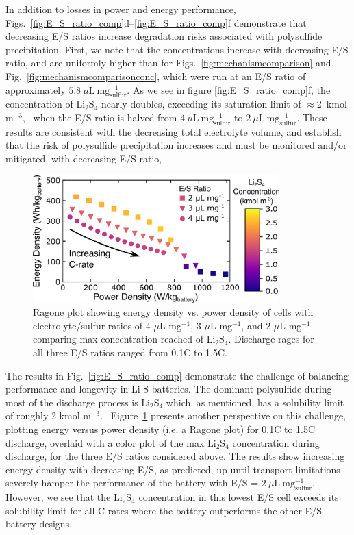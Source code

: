 \documentclass{elsarticle}
\begin{document}
In addition to losses in power and energy performance, Figs.~\ref{fig:E_S_ratio_comp}d--\ref{fig:E_S_ratio_comp}f demonstrate that decreasing E/S ratios increase degradation risks associated with polysulfide precipitation. First, we note that the concentrations increase with decreasing E/S ratio, and are uniformly higher than for Figs.~\ref{fig:mechanismcomparison} and Fig.~\ref{fig:mechanismcomparisonconc}, which were run at an E/S ratio of approximately $5.8 ~ \mu \mathrm{L} ~ \mathrm{mg}^{-1}_\mathrm{sulfur}$. As we see in figure \ref{fig:E_S_ratio_comp}f, the concentration of $\mathrm{Li}_2\mathrm{S}_4$ nearly doubles, exceeding its saturation limit of $\approx$2~kmol m$^{-3}$,~\cite{ANDREI2018469} when the E/S ratio is halved from $4 ~ \mu\mathrm{L} ~ \mathrm{mg}^{-1}_\mathrm{sulfur}$ to $2 ~ \mu\mathrm{L} ~ \mathrm{mg}^{-1}_\mathrm{sulfur}$. These results are consistent with the decreasing total electrolyte volume, and establish that the risk of polysulfide precipitation increases and must be monitored and/or mitigated, with decreasing E/S ratio,

\begin{figure}[b!]
    \centering
    \includegraphics[width=0.85\textwidth]{Figures/Figure6_Li2S4Ragone.png}
    \caption{Ragone plot showing energy density vs. power density of cells with electrolyte/sulfur ratios of 4 $\mu$L mg$^{-1}$, 3 $\mu$L mg$^{-1}$, and 2 $\mu$L mg$^{-1}$ comparing max concentration reached of Li$_2$S$_4$. Discharge rages for all three E/S ratios ranged from 0.1C to 1.5C.}
    \label{fig:ragoneLi2S4}
\end{figure}

The results in Fig.~\ref{fig:E_S_ratio_comp} demonstrate the challenge of balancing performance and longevity in Li-S batteries.  The dominant polysulfide during most of the discharge process is Li$_2$S$_4$ which, as mentioned, has a solubility limit of roughly 2 kmol m$^{-3}$.~\cite{ANDREI2018469}  Figure~\ref{fig:ragoneLi2S4} presents another perspective on this challenge, plotting energy versus power density (i.e. a Ragone plot) for 0.1C to 1.5C discharge, overlaid with a color plot of the max $\mathrm{Li}_2\mathrm{S}_4$ concentration during discharge, for the three E/S ratios considered above. The results show increasing energy density with decreasing E/S, as predicted, up until transport limitations severely hamper the performance of the battery with E/S = $2~\mu\mathrm{L} ~ \mathrm{mg}^{-1}_\mathrm{sulfur}$.  However, we see that the Li$_2$S$_4$ concentration in this lowest E/S cell exceeds its solubility limit for all C-rates where the battery outperforms the other E/S battery designs.  
\end{document}
